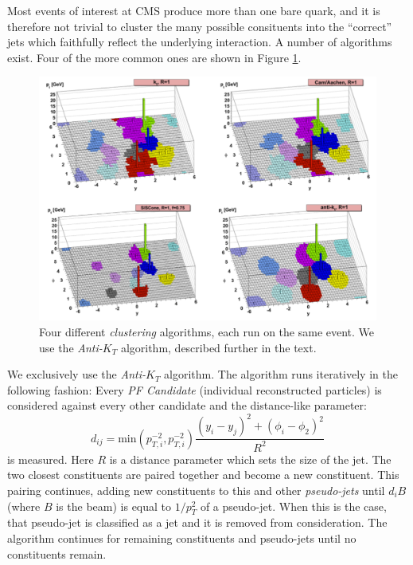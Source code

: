 Most events of interest at CMS produce more than one bare quark, and it is therefore not trivial to cluster the many possible consituents into the ``correct'' jets which faithfully reflect the underlying interaction. A number of algorithms exist. Four of the more common ones are shown in Figure \ref{Fig:CMS:JetAlgo}.
\begin{figure}[h!]
    \centering
        \includegraphics[width=\textwidth]{F3/JetAlgo}
        \caption{Four different \textit{clustering} algorithms, each run on the same event. We use the \textit{Anti-$K_{T}$} algorithm, described further in the text.}
        \label{Fig:CMS:JetAlgo}
\end{figure}
We exclusively use the \textit{Anti-$K_{T}$} algorithm\cite{Cacciari:2008gp}. The algorithm runs iteratively in the following fashion:
Every \textit{PF Candidate} (individual reconstructed particles) is considered against every other candidate and the distance-like parameter:
\begin{equation}
   d_{ij} = \textrm{min}(p_{T,i}^{-2},p_{T,i}^{-2})\frac{(y_i-y_j)^2+(\phi_i - \phi_2)^2}{R^2}
\end{equation}
is measured. Here $R$ is a distance parameter which sets the size of the jet. The two closest constituents are paired together and become a new constituent. This pairing continues, adding new constituents to this and other \textit{pseudo-jets} until $d_iB$ (where $B$ is the beam) is equal to $1/p_T^2$ of a pseudo-jet. When this is the case, that pseudo-jet is classified as a jet and it is removed from consideration. The algorithm continues for remaining constituents and pseudo-jets until no constituents remain.

